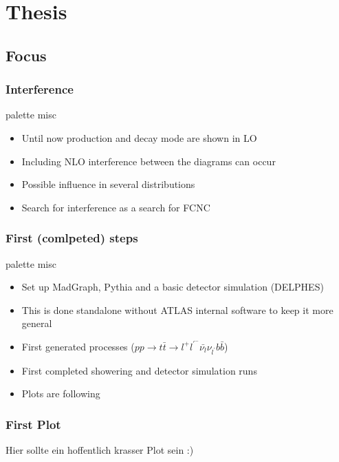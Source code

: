 \documentclass{beamer}
\begin{document}
\section{Thesis}
\subsection{Focus}

\begin{frame}[fragile]
\frametitle{Interference}
\begin{beamercolorbox}[rounded=true,shadow=true]{palette misc}
	\begin{itemize}
		\item Until now production and decay mode are shown in LO
		\item Including NLO interference between the diagrams can occur
		\item Possible influence in several distributions
		\item Search for interference as a search for FCNC
	\end{itemize}
\end{beamercolorbox}
\end{frame}

\begin{frame}[fragile]
\frametitle{First (comlpeted) steps}
\begin{beamercolorbox}[rounded=true,shadow=true]{palette misc}
	\begin{itemize}
		\item Set up MadGraph, Pythia and a basic detector simulation (DELPHES)
		\item This is done standalone without ATLAS internal software to keep it more general
		\item First generated processes ($pp \rightarrow t\bar{t} \rightarrow l^+ l^{'^{-}} \bar{\nu_{l}} \nu_{l^{'}} b \bar{b}$)
		\item First completed showering and detector simulation runs
		\item Plots are following
	\end{itemize}
\end{beamercolorbox}
\end{frame}

\begin{frame}[fragile]
\frametitle{First Plot}
Hier sollte ein hoffentlich krasser Plot sein :)
\end{frame}
\end{document}
